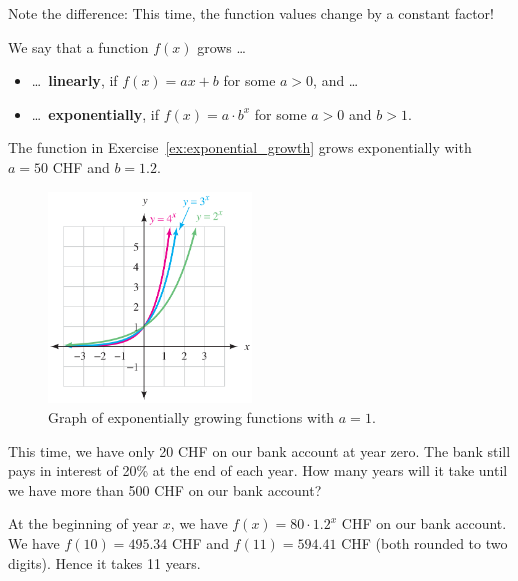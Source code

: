 \begin{tcolorbox}
	Note the difference: This time, the function values change by a constant factor!
\end{tcolorbox}
\newpage
\begin{tcolorbox}
	We say that a function $f\left(x\right)$ grows \ldots
	\begin{itemize}
		\item[] \ldots\ \textbf{linearly}, if $f\left(x\right)=ax+b$ for some $a>0$, and \ldots
		\item[] \ldots\ \textbf{exponentially}, if $f\left(x\right)=a\cdot b^x$ for some $a>0$ and $b>1$.
	\end{itemize}
\end{tcolorbox}
\begin{example}
	The function in Exercise~\ref{ex:exponential_growth} grows exponentially with $a=50$ CHF and $b=1.2$.
\end{example}
\begin{figure}[ht]
	\centering
	\includegraphics[width=0.48\textwidth]{images/exponentalb}
	\caption{Graph of exponentially growing functions with $a=1$.}
	\label{fig:differentb}
\end{figure}
\begin{exercise} \label{ex:first_exponential_equation}
	This time, we have only 20 CHF on our bank account at year zero.
	The bank still pays in interest of 20\% at the end of each year.
	How many years will it take until we have more than 500 CHF on our bank account?
\end{exercise}
\begin{solution*}
	At the beginning of year $x$, we have $f\left(x\right)=80\cdot 1.2^x$ CHF on our bank account.
	We have $f\left(10\right)=495.34$ CHF and $f\left(11\right)=594.41$ CHF (both rounded to two digits).
	Hence it takes 11 years.
\end{solution*}
